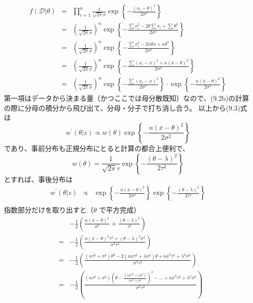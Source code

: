 \documentclass[10pt, a4paper]{ltjsarticle}
\begin{document}
\begin{eqnarray}
  f(\mathcal{D}|\theta) &=& \prod_{i=1}^n \frac{1}{\sqrt{2\pi}\sigma} \exp \left\{ - \frac{(x_i-\theta)^2}{2\sigma^2} \right\} \\
  &=& \left(\frac{1}{\sqrt{2\pi}\sigma} \right)^n \exp \left\{ - \frac{\sum x_i^2 -2\theta\sum x_i + \sum \theta^2}{2\sigma^2} \right\}\\ 
  &=& \left(\frac{1}{\sqrt{2\pi}\sigma} \right)^n \exp \left\{ - \frac{\sum x_i^2 -2n\theta\bar{x}+ n\theta^2}{2\sigma^2} \right\} \\ 
  &=& \left(\frac{1}{\sqrt{2\pi}\sigma} \right)^n \exp \left\{ - \frac{\sum (x_i-\bar{x})^2+ n(\bar{x} - \theta)^2}{2\sigma^2} \right\} \\ 
  &=& \left(\frac{1}{\sqrt{2\pi}\sigma} \right)^n \exp \left\{ - \frac{\sum (x_i-\bar{x})^2}{2\sigma^2} \right\} 
  \cdot \exp \left\{ -\frac{n(\bar{x} - \theta)^2}{2\sigma^2} \right\}
\end{eqnarray}
第一項はデータから決まる量（かつここでは母分散既知）なので、(9.2b)の計算の際に分母の積分から飛び出て、分母・分子で打ち消し合う。
以上から(9.3)式は
\begin{equation}
  w^\prime(\theta|z) \propto w(\theta) \exp \left\{ -\frac{n(\bar{x} - \theta)^2}{2\sigma^2} \right\}
\end{equation}
であり、事前分布も正規分布にとると計算の都合上便利で、
\begin{equation}
  w(\theta) = \frac{1}{\sqrt{2\pi}\tau} \exp \left\{ - \frac{(\theta-\lambda)^2}{2\tau^2} \right\}
\end{equation}
とすれば、事後分布は
\begin{eqnarray}
  w^\prime(\theta|z) &\propto& \exp \left\{ -\frac{n(\bar{x} - \theta)^2}{2\sigma^2} \right\}\exp \left\{ - \frac{(\theta-\lambda)^2}{2\tau^2} \right\} \\
\end{eqnarray}
指数部分だけを取り出すと（$\theta$ で平方完成）
\begin{eqnarray}
  && -\frac{1}{2} \left( \frac{n(\bar{x}-\theta)^2}{\sigma^2} + \frac{(\theta-\lambda)^2}{\tau^2}  \right) \\
  &=& -\frac{1}{2} \left( \frac{n(\bar{x}-\theta)^2\tau^2 + (\theta-\lambda)^2\sigma^2}{\sigma^2\tau^2} \right) \\
  &=& -\frac{1}{2} \left( \frac{(n\tau^2+\sigma^2)\theta^2 - 2(n\bar{x}\tau^2 + \lambda\sigma^2)\theta + n\bar{x}^2\tau^2 + \lambda^2\sigma^2}{\sigma^2\tau^2} \right) \\
  &=& -\frac{1}{2} \left( \frac{(n\tau^2+\sigma^2)\left( \theta - \frac{(n\bar{x}\tau^2 + \lambda\sigma^2)}{n\tau^2+\sigma^2}\right)^2 - ... + n\bar{x}^2\tau^2 + \lambda^2\sigma^2}{\sigma^2\tau^2} \right)
\end{eqnarray}
\end{document}
